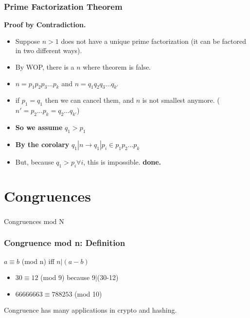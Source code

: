 \documentclass{beamer}
\begin{document}
\begin{frame}
  \frametitle{Prime Factorization Theorem}
  
  {\larger
    {\bf Proof by Contradiction.}

    \begin{itemize}
    \item Suppose $n > 1$ does not have a unique
      prime factorization (it can be factored in two different ways).
    \item<2-> By WOP, there is a  $n$ where theorem is false.
    \item<2-> $n = p_1p_2p_3\ldots p_k$ and $n = q_1q_2q_3\ldots q_{k'}$
    \item<3-> if $p_1 = q_1$ then we can cancel them, and $n$ is
      not smallest anymore. ($n' = p_2\ldots p_k = q_2\ldots q_{k'}$)
    \item<4-> {\bf So we assume } $q_1 > p_1$
    \item<4-> {\bf By the corolary} $q_1|n \rightarrow q_1|p_i \in p_1p_2\ldots p_k$
    \item<5> But, because $q_1 > p_i \forall i$, this is impossible. {\bf done.}
    \end{itemize}
  }
\end{frame}

\section{Congruences}
\begin{frame}
  \frametitle{}
  {\huge
    \begin{center}
      Congruences mod N
    \end{center}
  }
\end{frame}

\begin{frame}
  \frametitle{Congruence mod n: Definition}

  {\larger
    $a\equiv b$ (mod n) iff $n|(a-b)$

    \bigskip
    \begin{itemize}
    \item <2->$30\equiv12$ (mod 9) \hfill because 9|(30-12)
    \item <3->$66666663 \equiv 788253$ (mod 10)
    \end{itemize}

    \vfill

    Congruence has many applications in crypto and hashing.

  }
\end{frame}
\end{document}
